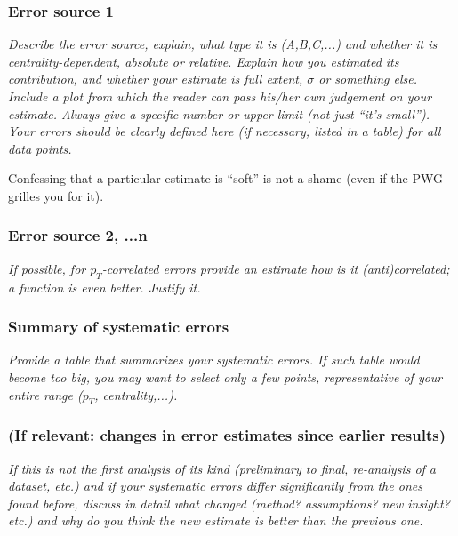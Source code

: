 \documentclass[12pt]{article}
\begin{document}
\subsubsection{Error source 1}

{\it 
  Describe the error source, explain, what type it is (A,B,C,...) and
  whether it is centrality-dependent, absolute or relative.  Explain
  how you estimated its  contribution, and whether your estimate is
  full extent, $\sigma$ or something else.  Include a plot from which
  the reader can pass his/her own judgement on your estimate.  Always
  give a specific number or upper limit (not just ``it's small'').
  Your errors should be clearly defined here (if necessary, listed in
  a  table) for all data points.

  Confessing that a particular estimate is ``soft'' is not a shame
  (even if the PWG grilles you for it).

}

\subsubsection{Error source 2, ...n}

{\it
  If possible, for $p_T$-correlated errors provide an estimate how is
  it (anti)correlated; a function is even better.  Justify it.
}

\subsubsection{Summary of systematic errors}

{\it
  Provide a table that summarizes your systematic errors.  If such
  table would become too big, you may want to select only a few
  points, representative of your entire range ($p_T$, centrality,...).


}


\subsubsection{(If relevant: changes in error estimates since earlier results)}

{\it
  If this is not the first analysis of its kind (preliminary to final,
  re-analysis of a dataset, etc.) and if your systematic errors differ
  significantly from the ones found before, discuss in detail what
  changed (method? assumptions? new insight? etc.) and why do you
  think the new estimate is better than the previous one.
}
\end{document}
